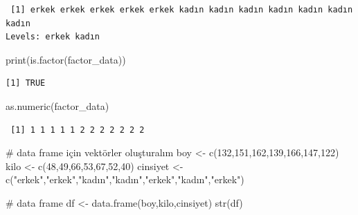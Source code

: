 \documentclass[
  letterpaper,
  DIV=11,
  numbers=noendperiod]{scrreprt}
\newenvironment{Shaded}{\begin{snugshade}}{\end{snugshade}}
\newcommand{\CommentTok}[1]{\textcolor[rgb]{0.37,0.37,0.37}{#1}}
\newcommand{\DecValTok}[1]{\textcolor[rgb]{0.68,0.00,0.00}{#1}}
\newcommand{\FunctionTok}[1]{\textcolor[rgb]{0.28,0.35,0.67}{#1}}
\newcommand{\NormalTok}[1]{\textcolor[rgb]{0.00,0.23,0.31}{#1}}
\newcommand{\OtherTok}[1]{\textcolor[rgb]{0.00,0.23,0.31}{#1}}
\newcommand{\StringTok}[1]{\textcolor[rgb]{0.13,0.47,0.30}{#1}}
\begin{document}
\begin{verbatim}
 [1] erkek erkek erkek erkek erkek kadın kadın kadın kadın kadın kadın kadın
Levels: erkek kadın
\end{verbatim}

\begin{Shaded}
\begin{Highlighting}[]
\FunctionTok{print}\NormalTok{(}\FunctionTok{is.factor}\NormalTok{(factor\_data))}
\end{Highlighting}
\end{Shaded}

\begin{verbatim}
[1] TRUE
\end{verbatim}

\begin{Shaded}
\begin{Highlighting}[]
\FunctionTok{as.numeric}\NormalTok{(factor\_data)}
\end{Highlighting}
\end{Shaded}

\begin{verbatim}
 [1] 1 1 1 1 1 2 2 2 2 2 2 2
\end{verbatim}

\begin{Shaded}
\begin{Highlighting}[]
\CommentTok{\# data frame için vektörler oluşturalım}
\NormalTok{boy }\OtherTok{\textless{}{-}} \FunctionTok{c}\NormalTok{(}\DecValTok{132}\NormalTok{,}\DecValTok{151}\NormalTok{,}\DecValTok{162}\NormalTok{,}\DecValTok{139}\NormalTok{,}\DecValTok{166}\NormalTok{,}\DecValTok{147}\NormalTok{,}\DecValTok{122}\NormalTok{)}
\NormalTok{kilo }\OtherTok{\textless{}{-}} \FunctionTok{c}\NormalTok{(}\DecValTok{48}\NormalTok{,}\DecValTok{49}\NormalTok{,}\DecValTok{66}\NormalTok{,}\DecValTok{53}\NormalTok{,}\DecValTok{67}\NormalTok{,}\DecValTok{52}\NormalTok{,}\DecValTok{40}\NormalTok{)}
\NormalTok{cinsiyet }\OtherTok{\textless{}{-}} \FunctionTok{c}\NormalTok{(}\StringTok{"erkek"}\NormalTok{,}\StringTok{"erkek"}\NormalTok{,}\StringTok{"kadın"}\NormalTok{,}\StringTok{"kadın"}\NormalTok{,}\StringTok{"erkek"}\NormalTok{,}\StringTok{"kadın"}\NormalTok{,}\StringTok{"erkek"}\NormalTok{)}

\CommentTok{\# data frame}
\NormalTok{df }\OtherTok{\textless{}{-}} \FunctionTok{data.frame}\NormalTok{(boy,kilo,cinsiyet)}
\FunctionTok{str}\NormalTok{(df)}
\end{Highlighting}
\end{Shaded}
\end{document}
